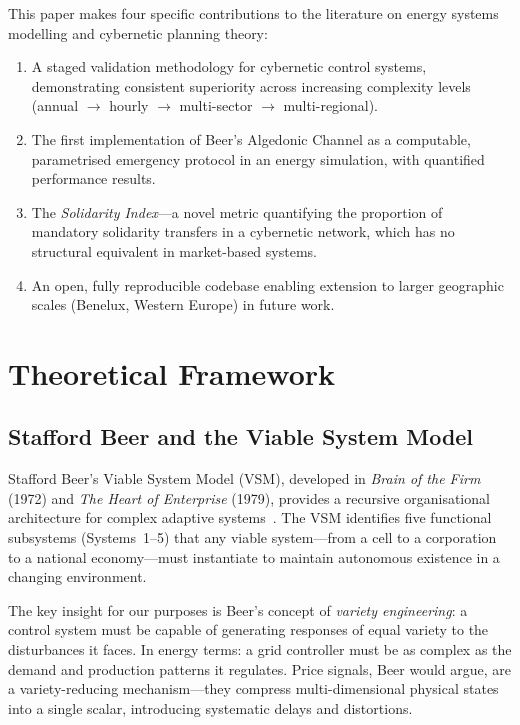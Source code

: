 \documentclass[12pt]{article}
\begin{document}
This paper makes four specific contributions to the literature on energy systems
modelling and cybernetic planning theory:

\begin{enumerate}
  \item A staged validation methodology for cybernetic control systems, demonstrating
        consistent superiority across increasing complexity levels
        (annual $\to$ hourly $\to$ multi-sector $\to$ multi-regional).
  \item The first implementation of Beer's Algedonic Channel as a computable,
        parametrised emergency protocol in an energy simulation, with quantified
        performance results.
  \item The \emph{Solidarity Index}---a novel metric quantifying the proportion of
        mandatory solidarity transfers in a cybernetic network, which has no
        structural equivalent in market-based systems.
  \item An open, fully reproducible codebase enabling extension to larger geographic
        scales (Benelux, Western Europe) in future work.
\end{enumerate}

\section{Theoretical Framework}

\subsection{Stafford Beer and the Viable System Model}

Stafford Beer's Viable System Model (VSM), developed in \emph{Brain of the Firm}
(1972) and \emph{The Heart of Enterprise} (1979), provides a recursive organisational
architecture for complex adaptive systems~\citep{beer1972brain, beer1979heart}.
The VSM identifies five functional subsystems (Systems~1--5) that any viable
system---from a cell to a corporation to a national economy---must instantiate to
maintain autonomous existence in a changing environment.

The key insight for our purposes is Beer's concept of \emph{variety engineering}: a
control system must be capable of generating responses of equal variety to the
disturbances it faces.
In energy terms: a grid controller must be as complex as the demand and production
patterns it regulates.
Price signals, Beer would argue, are a variety-reducing mechanism---they compress
multi-dimensional physical states into a single scalar, introducing systematic delays
and distortions.
\end{document}
